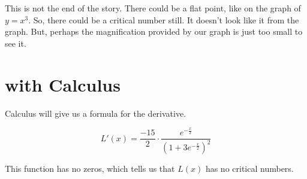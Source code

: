 \documentclass{ximera}
\begin{document}
This is not the end of the story. There could be a flat point, like on the graph of $y = x^3$. So, there could be a critical number still.  It doesn't look like it from the graph. But, perhaps the magnification provided by our graph is just too small to see it.



\section{with Calculus}


Calculus will give us a formula for the derivative.

\[  L'(x) =   \frac{-15}{2} \cdot \frac{e^{-\tfrac{x}{2}}}{\left(1+3 e^{-\tfrac{x}{2}}\right)^2}    \]


This function has no zeros, which tells us that $L(x)$ has no critical numbers.
\end{document}
